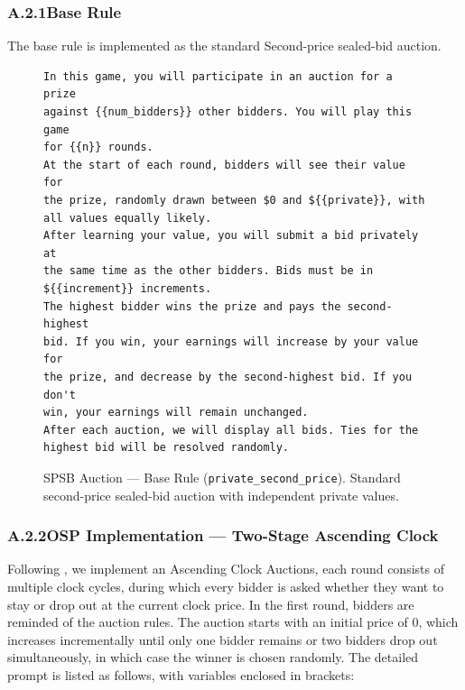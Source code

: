 \subsubsection*{A.2.1\quad Base Rule}
The base rule is implemented as the standard Second-price sealed-bid auction.

\begin{figure}[H]
\begin{lstlisting}
In this game, you will participate in an auction for a prize
against {{num_bidders}} other bidders. You will play this game
for {{n}} rounds.
At the start of each round, bidders will see their value for
the prize, randomly drawn between $0 and ${{private}}, with
all values equally likely.
After learning your value, you will submit a bid privately at
the same time as the other bidders. Bids must be in
${{increment}} increments.
The highest bidder wins the prize and pays the second-highest
bid. If you win, your earnings will increase by your value for
the prize, and decrease by the second-highest bid. If you don't
win, your earnings will remain unchanged.
After each auction, we will display all bids. Ties for the
highest bid will be resolved randomly.
\end{lstlisting}
\caption{SPSB Auction --- Base Rule (\texttt{private\_second\_price}). Standard second-price sealed-bid auction with independent private values.}
\label{fig:auction-base}
\end{figure}


\subsubsection*{A.2.2\quad OSP Implementation --- Two-Stage Ascending Clock}

Following \citet{breitmoser2022obviousness}, we implement an Ascending Clock Auctions, each round consists of multiple clock cycles, during which every bidder is asked whether they want to stay or drop out at the current clock price.
In the first round, bidders are reminded of the auction rules. 
The auction starts with an initial price of 0, which increases incrementally until only one bidder remains or two bidders drop out simultaneously, in which case the winner is chosen randomly. 
The detailed prompt is listed as follows, with variables enclosed in brackets:

